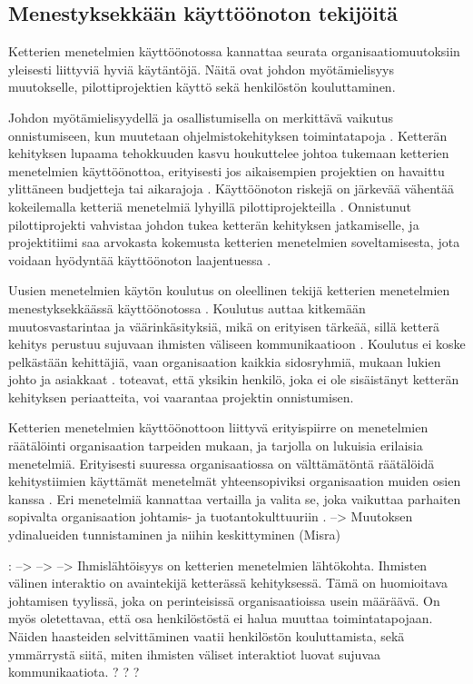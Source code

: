 \subsection{Menestyksekkään käyttöönoton tekijöitä}

Ketterien menetelmien käyttöönotossa kannattaa seurata organisaatiomuutoksiin
yleisesti liittyviä hyviä käytäntöjä. Näitä ovat johdon myötämielisyys
muutokselle, pilottiprojektien käyttö sekä henkilöstön kouluttaminen.

Johdon myötämielisyydellä ja osallistumisella on merkittävä vaikutus
onnistumiseen, kun muutetaan ohjelmistokehityksen toimintatapoja
. Ketterän kehityksen lupaama tehokkuuden kasvu
houkuttelee johtoa tukemaan ketterien menetelmien käyttöönottoa, erityisesti jos
aikaisempien projektien on havaittu ylittäneen budjetteja tai aikarajoja
. Käyttöönoton riskejä on järkevää vähentää kokeilemalla
ketteriä menetelmiä lyhyillä pilottiprojekteilla .
Onnistunut pilottiprojekti vahvistaa johdon tukea ketterän kehityksen
jatkamiselle, ja projektitiimi saa arvokasta kokemusta ketterien menetelmien
soveltamisesta, jota voidaan hyödyntää käyttöönoton laajentuessa
.

Uusien menetelmien käytön koulutus on oleellinen tekijä ketterien menetelmien
menestyksekkäässä käyttöönotossa . Koulutus auttaa
kitkemään muutosvastarintaa ja väärinkäsityksiä, mikä on erityisen tärkeää,
sillä ketterä kehitys perustuu sujuvaan ihmisten väliseen kommunikaatioon
. Koulutus ei koske pelkästään kehittäjiä, vaan
organisaation kaikkia sidosryhmiä, mukaan lukien johto ja asiakkaat
.  toteavat, että yksikin henkilö, joka ei
ole sisäistänyt ketterän kehityksen periaatteita, voi vaarantaa projektin
onnistumisen.

Ketterien menetelmien käyttöönottoon liittyvä erityispiirre on menetelmien
räätälöinti organisaation tarpeiden mukaan, ja tarjolla on lukuisia erilaisia
menetelmiä. Erityisesti suuressa organisaatiossa on välttämätöntä räätälöidä
kehitystiimien käyttämät menetelmät yhteensopiviksi organisaation muiden osien
kanssa . Eri menetelmiä kannattaa vertailla ja valita se,
joka vaikuttaa parhaiten sopivalta organisaation johtamis- ja
tuotantokulttuuriin .
--> Muutoksen ydinalueiden tunnistaminen ja niihin keskittyminen (Misra)

: --> -->
--> Ihmislähtöisyys on ketterien menetelmien lähtökohta. Ihmisten välinen
interaktio on avaintekijä ketterässä kehityksessä. Tämä on huomioitava
johtamisen tyylissä, joka on perinteisissä organisaatioissa usein määräävä. On
myös oletettavaa, että osa henkilöstöstä ei halua muuttaa toimintatapojaan.
Näiden haasteiden selvittäminen vaatii henkilöstön kouluttamista, sekä
ymmärrystä siitä, miten ihmisten väliset interaktiot luovat sujuvaa
kommunikaatiota. ? ? ?

